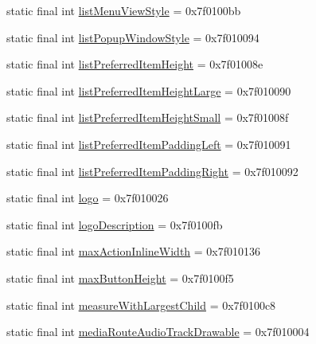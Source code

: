 \begin{CompactItemize}
\item 
static final int \hyperlink{classandroid_1_1support_1_1v7_1_1recyclerview_1_1_r_1_1attr_c8c45be455184352440f0d68a3c610fd}{listMenuViewStyle} = 0x7f0100bb
\item 
static final int \hyperlink{classandroid_1_1support_1_1v7_1_1recyclerview_1_1_r_1_1attr_5b70ae5d0e20df7bcbdf813c16c1063a}{listPopupWindowStyle} = 0x7f010094
\item 
static final int \hyperlink{classandroid_1_1support_1_1v7_1_1recyclerview_1_1_r_1_1attr_eb937b4a1f0f1f0570ba4f7e18c845f6}{listPreferredItemHeight} = 0x7f01008e
\item 
static final int \hyperlink{classandroid_1_1support_1_1v7_1_1recyclerview_1_1_r_1_1attr_81c018c133dc88c99e20d6e0bbe3027e}{listPreferredItemHeightLarge} = 0x7f010090
\item 
static final int \hyperlink{classandroid_1_1support_1_1v7_1_1recyclerview_1_1_r_1_1attr_74ee75fcf0575a786519802610f68289}{listPreferredItemHeightSmall} = 0x7f01008f
\item 
static final int \hyperlink{classandroid_1_1support_1_1v7_1_1recyclerview_1_1_r_1_1attr_c09d5100dabc17eea42b1afd39d3909c}{listPreferredItemPaddingLeft} = 0x7f010091
\item 
static final int \hyperlink{classandroid_1_1support_1_1v7_1_1recyclerview_1_1_r_1_1attr_1b78e8156d5ed72432afec3d62daef59}{listPreferredItemPaddingRight} = 0x7f010092
\item 
static final int \hyperlink{classandroid_1_1support_1_1v7_1_1recyclerview_1_1_r_1_1attr_e441bb972b1b92765144d7cdb1036d7e}{logo} = 0x7f010026
\item 
static final int \hyperlink{classandroid_1_1support_1_1v7_1_1recyclerview_1_1_r_1_1attr_59f40cb38717c1ad471df50fb3ebff26}{logoDescription} = 0x7f0100fb
\item 
static final int \hyperlink{classandroid_1_1support_1_1v7_1_1recyclerview_1_1_r_1_1attr_3ceba639ac73090ef7acdaea7520bf75}{maxActionInlineWidth} = 0x7f010136
\item 
static final int \hyperlink{classandroid_1_1support_1_1v7_1_1recyclerview_1_1_r_1_1attr_5dfa3af13ea03476154203e1e67d7665}{maxButtonHeight} = 0x7f0100f5
\item 
static final int \hyperlink{classandroid_1_1support_1_1v7_1_1recyclerview_1_1_r_1_1attr_6d372c63844ad4adc796e01614524ca8}{measureWithLargestChild} = 0x7f0100c8
\item 
static final int \hyperlink{classandroid_1_1support_1_1v7_1_1recyclerview_1_1_r_1_1attr_d43bcae75539b2c1fc4d2b8dc0d78d5d}{mediaRouteAudioTrackDrawable} = 0x7f010004

\end{CompactItemize}
